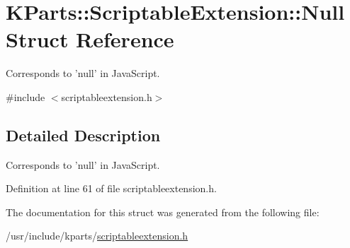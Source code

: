 \hypertarget{structKParts_1_1ScriptableExtension_1_1Null}{\section{\-K\-Parts\-:\-:\-Scriptable\-Extension\-:\-:\-Null \-Struct \-Reference}
\label{structKParts_1_1ScriptableExtension_1_1Null}
}


\-Corresponds to 'null' in \-Java\-Script.  




{\ttfamily \#include $<$scriptableextension.\-h$>$}



\subsection{\-Detailed \-Description}
\-Corresponds to 'null' in \-Java\-Script. 

\-Definition at line 61 of file scriptableextension.\-h.



\-The documentation for this struct was generated from the following file\-:\begin{DoxyCompactItemize}
\item 
/usr/include/kparts/\hyperlink{scriptableextension_8h}{scriptableextension.\-h}\end{DoxyCompactItemize}
